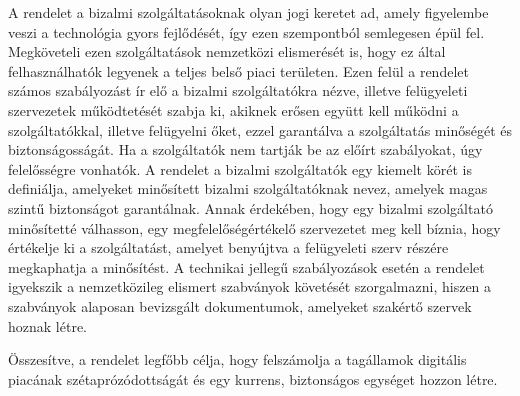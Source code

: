 A rendelet a bizalmi szolgáltatásoknak olyan jogi keretet ad, amely figyelembe veszi a technológia gyors fejlődését, így ezen szempontból semlegesen épül fel. Megköveteli ezen szolgáltatások nemzetközi elismerését is, hogy ez által felhasználhatók legyenek a teljes belső piaci területen. Ezen felül a rendelet számos szabályozást ír elő a bizalmi szolgáltatókra nézve, illetve felügyeleti szervezetek működtetését szabja ki, akiknek erősen együtt kell működni a szolgáltatókkal, illetve felügyelni őket, ezzel garantálva a szolgáltatás minőségét és biztonságosságát. Ha a szolgáltatók nem tartják be az előírt szabályokat, úgy felelősségre vonhatók. A rendelet a bizalmi szolgáltatók egy kiemelt körét is definiálja, amelyeket minősített bizalmi szolgáltatóknak nevez, amelyek magas szintű biztonságot garantálnak. Annak érdekében, hogy egy bizalmi szolgáltató minősítetté válhasson, egy megfelelőségértékelő szervezetet meg kell bíznia, hogy értékelje ki a szolgáltatást, amelyet benyújtva a felügyeleti szerv részére megkaphatja a minősítést. A technikai jellegű szabályozások esetén a rendelet igyekszik a nemzetközileg elismert szabványok követését szorgalmazni, hiszen a szabványok alaposan bevizsgált dokumentumok, amelyeket szakértő szervek hoznak létre.

Összesítve, a rendelet legfőbb célja, hogy felszámolja a tagállamok digitális piacának szétaprózódottságát és egy kurrens, biztonságos egységet hozzon létre. \cite{eIDAS}